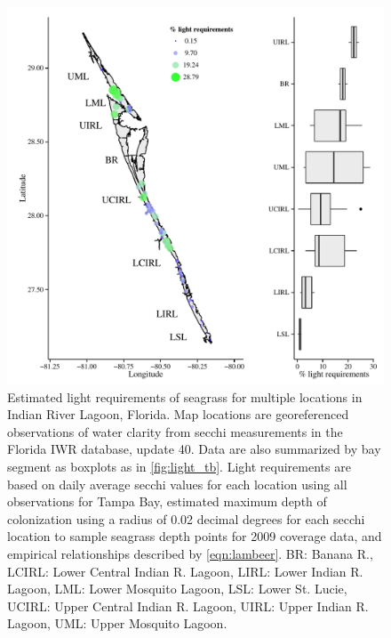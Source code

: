 \documentclass[letterpaper,12pt,oneside]{article}\usepackage[]{graphicx}\usepackage[]{color}
\begin{document}
\begin{figure}
\centering
\includegraphics[width = \textwidth]{figs/light_irl.pdf}
\caption{Estimated light requirements of seagrass for multiple locations in Indian River Lagoon, Florida.  Map locations are georeferenced observations of water clarity from secchi measurements in the Florida \acl{IWR} database, update 40.  Data are also summarized by bay segment as boxplots as in \cref{fig:light_tb}. Light requirements are based on daily average secchi values for each location using all observations for Tampa Bay, estimated maximum depth of colonization using a radius of 0.02 decimal degrees for each secchi location to sample seagrass depth points for 2009 coverage data, and empirical relationships described by \cref{eqn:lambeer}. BR: Banana R., LCIRL: Lower Central Indian R. Lagoon, LIRL: Lower Indian R. Lagoon, LML: Lower Mosquito Lagoon, LSL: Lower St. Lucie, UCIRL: Upper Central Indian R. Lagoon, UIRL: Upper Indian R. Lagoon, UML: Upper Mosquito Lagoon.}
\label{fig:light_irl}
\end{figure}
\end{document}
